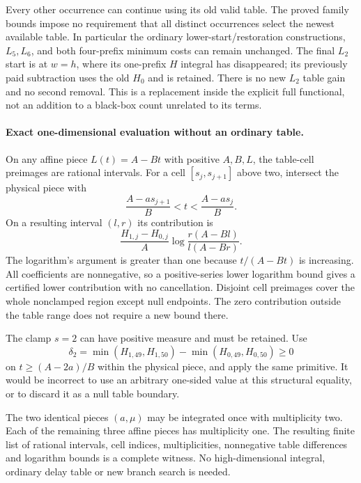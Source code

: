 Every other occurrence can continue using its old valid table. The
proved family bounds impose no requirement that all distinct
occurrences select the newest available table. In particular the
ordinary lower-start/restoration constructions, $L_5,L_6$, and both
four-prefix minimum costs can remain unchanged. The final $L_2$ start
is at $w=h$, where its one-prefix $H$ integral has disappeared; its
previously paid subtraction uses the old $H_0$ and is retained. There
is no new $L_2$ table gain and no second removal. This is a replacement
inside the explicit full functional, not an addition to a black-box
count unrelated to its terms.

\paragraph{Exact one-dimensional evaluation without an ordinary table.}
On any affine piece $L(t)=A-Bt$ with positive $A,B,L$, the table-cell
preimages are rational intervals. For a cell $[s_j,s_{j+1}]$ above
two, intersect the physical piece with
\[
 \frac{A-as_{j+1}}B<t<\frac{A-as_j}B.
\]
On a resulting interval $(l,r)$ its contribution is
\[
 \frac{H_{1,j}-H_{0,j}}A
       \log\frac{r(A-Bl)}{l(A-Br)}.
\]
The logarithm's argument is greater than one because
$t/(A-Bt)$ is increasing. All coefficients are nonnegative, so a
positive-series lower logarithm bound gives a certified lower
contribution with no cancellation. Disjoint cell preimages cover the
whole nonclamped region except null endpoints. The zero contribution
outside the table range does not require a new bound there.

The clamp $s=2$ can have positive measure and must be retained. Use
\[
 \delta_2=\min(H_{1,49},H_{1,50})
          -\min(H_{0,49},H_{0,50})\ge0
\]
on $t\ge(A-2a)/B$ within the physical piece, and apply the same
primitive. It would be incorrect to use an arbitrary one-sided value
at this structural equality, or to discard it as a null table boundary.

The two identical pieces $(a,\mu)$ may be integrated once with
multiplicity two. Each of the remaining three affine pieces has
multiplicity one. The resulting finite list of rational intervals,
cell indices, multiplicities, nonnegative table differences and
logarithm bounds is a complete witness. No high-dimensional integral,
ordinary delay table or new branch search is needed.

